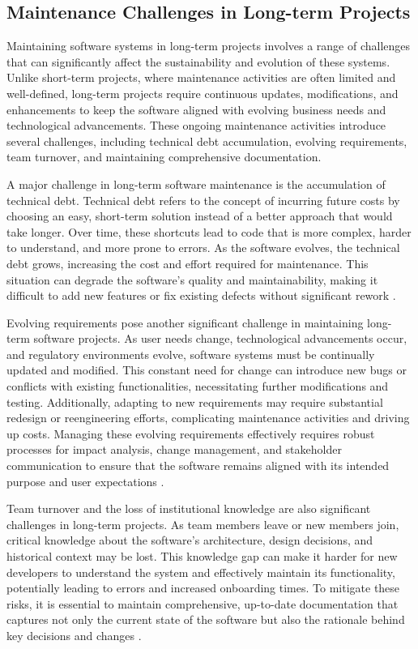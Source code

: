 \begin{refsection}
\subsection{Maintenance Challenges in Long-term Projects}

Maintaining software systems in long-term projects involves a range of challenges that can significantly affect the sustainability and evolution of these systems. Unlike short-term projects, where maintenance activities are often limited and well-defined, long-term projects require continuous updates, modifications, and enhancements to keep the software aligned with evolving business needs and technological advancements. These ongoing maintenance activities introduce several challenges, including technical debt accumulation, evolving requirements, team turnover, and maintaining comprehensive documentation.

A major challenge in long-term software maintenance is the accumulation of technical debt. Technical debt refers to the concept of incurring future costs by choosing an easy, short-term solution instead of a better approach that would take longer. Over time, these shortcuts lead to code that is more complex, harder to understand, and more prone to errors. As the software evolves, the technical debt grows, increasing the cost and effort required for maintenance. This situation can degrade the software’s quality and maintainability, making it difficult to add new features or fix existing defects without significant rework \cite[pp.~45-47]{brown2011managing}. 

Evolving requirements pose another significant challenge in maintaining long-term software projects. As user needs change, technological advancements occur, and regulatory environments evolve, software systems must be continually updated and modified. This constant need for change can introduce new bugs or conflicts with existing functionalities, necessitating further modifications and testing. Additionally, adapting to new requirements may require substantial redesign or reengineering efforts, complicating maintenance activities and driving up costs. Managing these evolving requirements effectively requires robust processes for impact analysis, change management, and stakeholder communication to ensure that the software remains aligned with its intended purpose and user expectations \cite[pp.~201-203]{fairley2012managing}.

Team turnover and the loss of institutional knowledge are also significant challenges in long-term projects. As team members leave or new members join, critical knowledge about the software’s architecture, design decisions, and historical context may be lost. This knowledge gap can make it harder for new developers to understand the system and effectively maintain its functionality, potentially leading to errors and increased onboarding times. To mitigate these risks, it is essential to maintain comprehensive, up-to-date documentation that captures not only the current state of the software but also the rationale behind key decisions and changes \cite[pp.~133-135]{weinberg2011psychology}.


\end{refsection}
